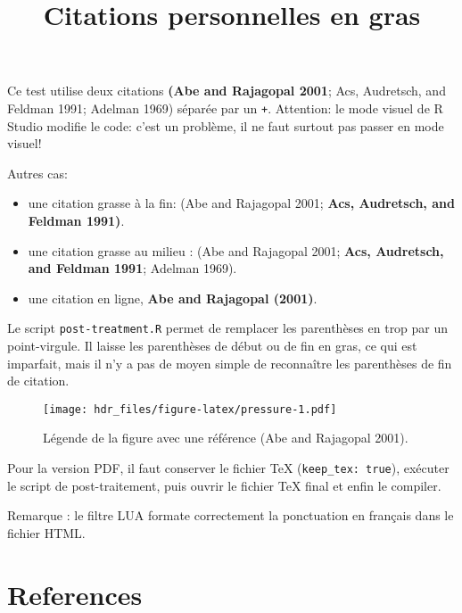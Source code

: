 \documentclass[
]{article}
\title{Citations personnelles en gras}
\author{}
\date{\vspace{-2.5em}}
\providecommand{\tightlist}{%
  \setlength{\itemsep}{0pt}\setlength{\parskip}{0pt}}
\begin{document}
\maketitle

Ce test utilise deux citations \textbf{(Abe and Rajagopal 2001}; Acs, Audretsch, and Feldman 1991; Adelman 1969) séparée par un \texttt{+}.
Attention: le mode visuel de R Studio modifie le code: c'est un problème, il ne faut surtout pas passer en mode visuel!

Autres cas:

\begin{itemize}
\tightlist
\item
  une citation grasse à la fin: (Abe and Rajagopal 2001; \textbf{Acs, Audretsch, and Feldman 1991)}.
\item
  une citation grasse au milieu : (Abe and Rajagopal 2001; \textbf{Acs, Audretsch, and Feldman 1991}; Adelman 1969).
\item
  une citation en ligne, \textbf{Abe and Rajagopal (2001)}.
\end{itemize}

Le script \texttt{post-treatment.R} permet de remplacer les parenthèses en trop par un point-virgule.
Il laisse les parenthèses de début ou de fin en gras, ce qui est imparfait, mais il n'y a pas de moyen simple de reconnaître les parenthèses de fin de citation.



\begin{figure}
\centering
\texttt{[image: hdr\_files/figure-latex/pressure-1.pdf]}
\caption{\label{fig:pressure}Légende de la figure avec une référence (Abe and Rajagopal 2001).}
\end{figure}

Pour la version PDF, il faut conserver le fichier TeX (\texttt{keep\_tex:\ true}), exécuter le script de post-traitement, puis ouvrir le fichier TeX final et enfin le compiler.

Remarque : le filtre LUA formate correctement la ponctuation en français dans le fichier HTML.

\section*{References}\label{references}
\end{document}
